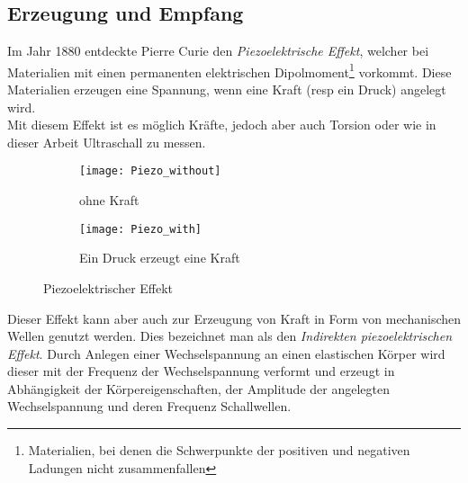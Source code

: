 \subsection{Erzeugung und Empfang}
Im Jahr 1880 entdeckte Pierre Curie den \textit{Piezoelektrische Effekt}, welcher bei Materialien mit einen permanenten elektrischen Dipolmoment\footnote{Materialien, bei denen die Schwerpunkte der positiven und negativen Ladungen nicht zusammenfallen} vorkommt. Diese Materialien erzeugen eine Spannung, wenn eine Kraft (\ac{resp} ein Druck) angelegt wird.\\
Mit diesem Effekt ist es möglich Kräfte, jedoch aber auch Torsion oder wie in dieser Arbeit Ultraschall zu messen. 
\begin{figure}[hb]
	\centering
	\begin{subfigure}[b]{0.49\textwidth}
		\centering
  		\texttt{[image: Piezo\_without]}  
  		\caption{ohne Kraft}
  		\label{fig:piezo_without}
  	\end{subfigure}
  	\hfill
  	\begin{subfigure}[b]{0.49\textwidth}
	  	\centering
  		\texttt{[image: Piezo\_with]}  
  		\caption{Ein Druck erzeugt eine Kraft}
  		\label{fig:piezo_with}
  	\end{subfigure}
  	\caption{Piezoelektrischer Effekt}
  	\label{fig:piezo}
\end{figure}
Dieser Effekt kann aber auch zur Erzeugung von Kraft in Form von mechanischen Wellen genutzt werden. Dies bezeichnet man als den \textit{Indirekten piezoelektrischen Effekt}. Durch Anlegen einer Wechselspannung an einen elastischen Körper wird dieser mit der Frequenz der Wechselspannung verformt und erzeugt in Abhängigkeit der Körpereigenschaften, der Amplitude der angelegten Wechselspannung und deren Frequenz Schallwellen.
%
\cite{suter2006}\cite{suter2009}\cite{suter2010}
%
